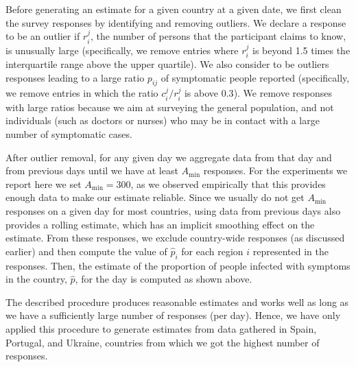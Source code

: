 \documentclass{article}
\begin{document}
Before generating an estimate for a given country at a given date, we first clean the survey responses by identifying and removing outliers. We declare a response to be an outlier if  $r_i^j$, the number of persons that the participant claims to know, is unusually large (specifically, we remove entries where  $r_i^j$ is beyond 1.5 times the interquartile range above the upper quartile). We also consider to be outliers responses leading to a large ratio $p_{ij}$ of symptomatic people reported (specifically, we remove entries in which the ratio $c_{i}^j/r_i^j$ is above $0.3$). We remove responses with large ratios because we aim at surveying the general population, and not individuals (such as doctors or nurses) who may be in contact with a large number of symptomatic cases. 

After outlier removal, for any given day we aggregate data from that day and from previous days until we have at least $A_{\min}$ responses. For the experiments we report here we set $A_{\min} = 300$, as we observed  empirically that this provides enough data to make our estimate reliable. Since we usually do not get $A_{\min}$ responses on a given day for most countries, using data from previous days also provides a rolling estimate, which has an implicit smoothing effect on the estimate. From these responses, we exclude country-wide responses (as discussed earlier) and then compute the value of $\hat{p}_i$ for each region $i$ represented in the responses. Then, the estimate of the proportion of people infected with symptoms in the country, $\hat{p}$, for the day is computed as shown above. 


The described procedure produces reasonable estimates 
and works well as long as we have a sufficiently large number of responses (per day).  
Hence, we have only applied this procedure to generate estimates from data gathered in Spain, Portugal, and Ukraine, countries from which we got the highest number of responses. 
\end{document}
